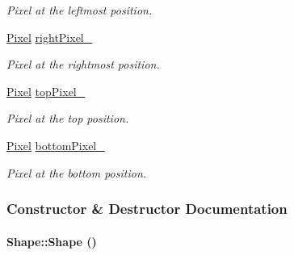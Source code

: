 \begin{CompactItemize}
\begin{CompactList}\small\item\em Pixel at the leftmost position. \item\end{CompactList}\item 
\hypertarget{class_shape_16adfccce492a7a0e34c5ade941c32fd}{
\hyperlink{_shape_8hpp_535e59456e3e633842529cfa8ea103c4}{Pixel} \hyperlink{class_shape_16adfccce492a7a0e34c5ade941c32fd}{rightPixel\_\-}}
\label{class_shape_16adfccce492a7a0e34c5ade941c32fd}

\begin{CompactList}\small\item\em Pixel at the rightmost position. \item\end{CompactList}\item 
\hypertarget{class_shape_c6755e0dbd9d2eaf537e232fd003c918}{
\hyperlink{_shape_8hpp_535e59456e3e633842529cfa8ea103c4}{Pixel} \hyperlink{class_shape_c6755e0dbd9d2eaf537e232fd003c918}{topPixel\_\-}}
\label{class_shape_c6755e0dbd9d2eaf537e232fd003c918}

\begin{CompactList}\small\item\em Pixel at the top position. \item\end{CompactList}\item 
\hypertarget{class_shape_8277820de6ff8da989a0659f4e5d82d1}{
\hyperlink{_shape_8hpp_535e59456e3e633842529cfa8ea103c4}{Pixel} \hyperlink{class_shape_8277820de6ff8da989a0659f4e5d82d1}{bottomPixel\_\-}}
\label{class_shape_8277820de6ff8da989a0659f4e5d82d1}

\begin{CompactList}\small\item\em Pixel at the bottom position. \item\end{CompactList}\end{CompactItemize}


\subsubsection{Constructor \& Destructor Documentation}
\hypertarget{class_shape_aa8d87171e65e0d8ba3c5459978992a7}{
\paragraph[Shape]{\setlength{\rightskip}{0pt plus 5cm}Shape::Shape ()}\hfill}
\label{class_shape_aa8d87171e65e0d8ba3c5459978992a7}


